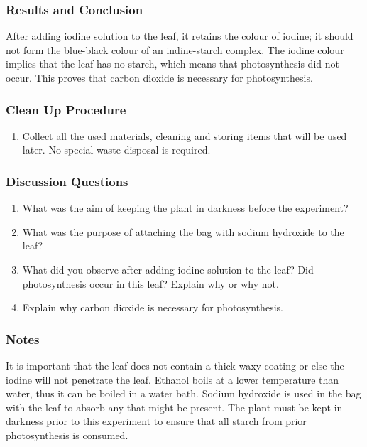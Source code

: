 \subsubsection*{Results and Conclusion}
After adding iodine solution to the leaf, it retains the colour of iodine; it should not form the blue-black colour of an indine-starch complex. The iodine colour implies that the leaf has no starch, which means that photosynthesis did not occur. This proves that carbon dioxide is necessary for photosynthesis.

\subsubsection*{Clean Up Procedure}
\begin{enumerate}
\item{Collect all the used materials, cleaning and storing items that will be used later. No special waste disposal is required.}
\end{enumerate}

\subsubsection*{Discussion Questions}
\begin{enumerate}
\item{What was the aim of keeping the plant in darkness before the experiment?}
\item{What was the purpose of attaching the bag with sodium hydroxide to the leaf?}
\item{What did you observe after adding iodine solution to the leaf? Did photosynthesis occur in this leaf? Explain why or why not.}
\item{Explain why carbon dioxide is necessary for photosynthesis.}
\end{enumerate}

\subsubsection*{Notes}
It is important that the leaf does not contain a thick waxy coating or else the iodine will not penetrate the leaf. Ethanol boils at a lower temperature than water, thus it can be boiled in a water bath. Sodium hydroxide is used in the bag with the leaf to absorb any  that might be present. The plant must be kept in darkness prior to this experiment to ensure that all starch from prior photosynthesis is consumed.

